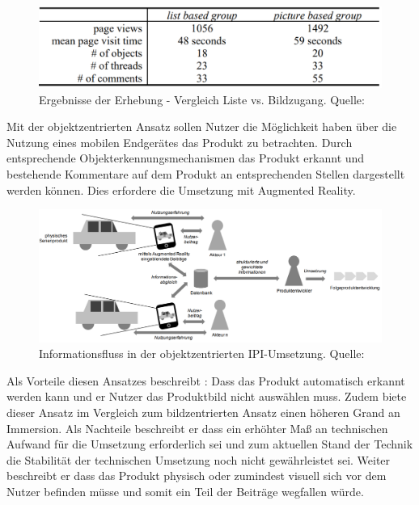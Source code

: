 \begin{figure}[H]
	\centering
	\includegraphics[width=.8\textwidth]{resources/analyse/results_list_picture_based.png}
	\caption{Ergebnisse der Erhebung - Vergleich Liste vs. Bildzugang. Quelle: \cite[S.~7]{Kirschner2011}}
	\label{img:ergebnisse_listen_bildzugang}
\end{figure}

Mit der objektzentrierten Ansatz sollen Nutzer die Möglichkeit haben über die Nutzung eines mobilen Endgerätes das Produkt zu betrachten. 
Durch entsprechende Objekterkennungsmechanismen das Produkt erkannt und bestehende Kommentare auf dem Produkt an entsprechenden Stellen dargestellt werden können.
Dies erfordere die Umsetzung mit Augmented Reality.\cite[S.~135]{Kirschner2012}

\begin{figure}[H]
	\centering
	\includegraphics[width=1.0\textwidth]{resources/analyse/IPI_Objektzentriert.png}
	\caption{Informationsfluss in der objektzentrierten IPI-Umsetzung. Quelle:\cite[S.~135]{Kirschner2012}}
	\label{img:objekt_centered_ipi}
\end{figure}

Als Vorteile diesen Ansatzes beschreibt \citeauthor{Kirschner2012}: Dass das Produkt automatisch erkannt werden kann und er Nutzer das Produktbild nicht auswählen muss. Zudem biete dieser Ansatz im Vergleich zum 
bildzentrierten Ansatz einen höheren Grand an Immersion. Als Nachteile beschreibt er dass ein erhöhter Maß an technischen Aufwand für die Umsetzung erforderlich sei und zum aktuellen Stand der Technik die 
Stabilität der technischen Umsetzung noch nicht gewährleistet sei. Weiter beschreibt er dass das Produkt physisch oder zumindest visuell sich vor dem Nutzer befinden müsse und somit ein Teil der Beiträge wegfallen würde.\cite[S.~130]{Kirschner2012}








